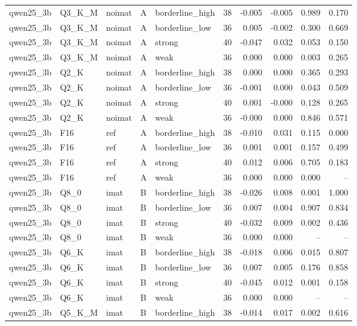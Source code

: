 \begin{tabular}{lllllrrrrr}
qwen25\_3b & Q3\_K\_M & noimat & A & borderline\_high & 38 & -0.005 & -0.005 & 0.989 & 0.170 \\
qwen25\_3b & Q3\_K\_M & noimat & A & borderline\_low & 36 & 0.005 & -0.002 & 0.300 & 0.669 \\
qwen25\_3b & Q3\_K\_M & noimat & A & strong & 40 & -0.047 & 0.032 & 0.053 & 0.150 \\
qwen25\_3b & Q3\_K\_M & noimat & A & weak & 36 & 0.000 & 0.000 & 0.003 & 0.265 \\
qwen25\_3b & Q2\_K & noimat & A & borderline\_high & 38 & 0.000 & 0.000 & 0.365 & 0.293 \\
qwen25\_3b & Q2\_K & noimat & A & borderline\_low & 36 & -0.001 & 0.000 & 0.043 & 0.509 \\
qwen25\_3b & Q2\_K & noimat & A & strong & 40 & 0.001 & -0.000 & 0.128 & 0.265 \\
qwen25\_3b & Q2\_K & noimat & A & weak & 36 & -0.000 & 0.000 & 0.846 & 0.571 \\
qwen25\_3b & F16 & ref & A & borderline\_high & 38 & -0.010 & 0.031 & 0.115 & 0.000 \\
qwen25\_3b & F16 & ref & A & borderline\_low & 36 & 0.001 & 0.001 & 0.157 & 0.499 \\
qwen25\_3b & F16 & ref & A & strong & 40 & 0.012 & 0.006 & 0.705 & 0.183 \\
qwen25\_3b & F16 & ref & A & weak & 36 & 0.000 & 0.000 & 0.000 & -- \\
qwen25\_3b & Q8\_0 & imat & B & borderline\_high & 38 & -0.026 & 0.008 & 0.001 & 1.000 \\
qwen25\_3b & Q8\_0 & imat & B & borderline\_low & 36 & 0.007 & 0.004 & 0.907 & 0.834 \\
qwen25\_3b & Q8\_0 & imat & B & strong & 40 & -0.032 & 0.009 & 0.002 & 0.436 \\
qwen25\_3b & Q8\_0 & imat & B & weak & 36 & 0.000 & 0.000 & -- & -- \\
qwen25\_3b & Q6\_K & imat & B & borderline\_high & 38 & -0.018 & 0.006 & 0.015 & 0.807 \\
qwen25\_3b & Q6\_K & imat & B & borderline\_low & 36 & 0.007 & 0.005 & 0.176 & 0.858 \\
qwen25\_3b & Q6\_K & imat & B & strong & 40 & -0.045 & 0.012 & 0.001 & 0.158 \\
qwen25\_3b & Q6\_K & imat & B & weak & 36 & 0.000 & 0.000 & -- & -- \\
qwen25\_3b & Q5\_K\_M & imat & B & borderline\_high & 38 & -0.014 & 0.017 & 0.002 & 0.616 \\

\end{tabular}
